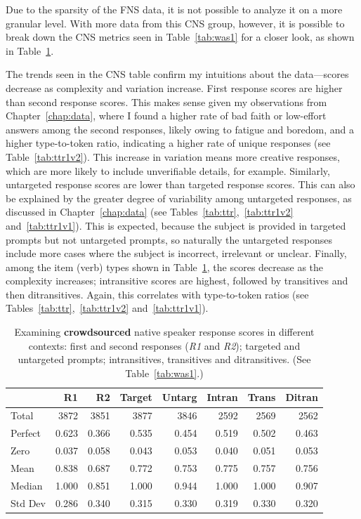 Due to the sparsity of the FNS data, it is not possible to analyze it on a more granular level. With more data from this CNS group, however, it is possible to break down the CNS metrics seen in Table~\ref{tab:was1} for a closer look, as shown in Table~\ref{tab:was2}.

The trends seen in the CNS table confirm my intuitions about the data---scores decrease as complexity and variation increase. First response scores are higher than second response scores. This makes sense given my observations from Chapter~\ref{chap:data}, where I found a higher rate of bad faith or low-effort answers among the second responses, likely owing to fatigue and boredom, and a higher type-to-token ratio, indicating a higher rate of unique responses (see Table~\ref{tab:ttr1v2}). This increase in variation means more creative responses, which are more likely to include unverifiable details, for example. Similarly, untargeted response scores are lower than targeted response scores. This can also be explained by the greater degree of variability among untargeted responses, as discussed in Chapter~\ref{chap:data} (see Tables~\ref{tab:ttr},~\ref{tab:ttr1v2} and~\ref{tab:ttr1v1}). This is expected, because the subject is provided in targeted prompts but not untargeted prompts, so naturally the untargeted responses include more cases where the subject is incorrect, irrelevant or unclear. Finally, among the item (verb) types shown in Table~\ref{tab:was2}, the scores decrease as the complexity increases; intransitive scores are highest, followed by transitives and then ditransitives. Again, this correlates with type-to-token ratios (see Tables~\ref{tab:ttr},~\ref{tab:ttr1v2} and~\ref{tab:ttr1v1}). 

\begin{table}[htb!]
\begin{center}
\begin{tabular}{|l||r|r||r|r||r|r|r|}
\hline
 & R1 & R2 & Target & Untarg & Intran & Trans & Ditran \\
\hline
\hline
Total & 3872 & 3851 & 3877 & 3846 & 2592 & 2569 & 2562 \\
\hline
\hline
Perfect & 0.623 & 0.366 & 0.535 & 0.454 & 0.519 & 0.502 & 0.463 \\
\hline
Zero  & 0.037 & 0.058 & 0.043 & 0.053 & 0.040 & 0.051 & 0.053  \\
\hline
\hline
Mean  & 0.838 & 0.687 & 0.772 & 0.753 & 0.775 & 0.757 & 0.756  \\
\hline
Median  & 1.000 & 0.851 & 1.000 & 0.944 & 1.000 & 1.000 & 0.907  \\
\hline
Std Dev  & 0.286 & 0.340 & 0.315 & 0.330 & 0.319 & 0.330 & 0.320  \\
\hline
\end{tabular}
\caption{\label{tab:was2} Examining \textbf{crowdsourced} native speaker response scores in different contexts: first and second responses (\textit{R1} and \textit{R2});  targeted and untargeted prompts; intransitives, transitives and ditransitives. (See Table~\ref{tab:was1}.)}
\end{center}
\end{table}

